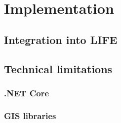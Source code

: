 
\chapter{Implementation}



\section{Integration into LIFE}



\section{Technical limitations}


\subsection{.NET Core}


\subsection{GIS libraries}
